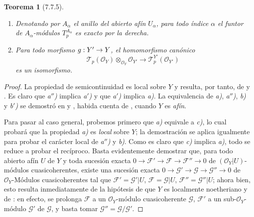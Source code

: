 \documentclass[10pt,oneside,openany]{book}
\theoremstyle{egaenv}\newtheorem*{env}{---}
\theoremstyle{egastatement}
\newtheorem*{theorem}{Teorema}
\theoremstyle{egadescription}
\renewcommand{\to}{\mathchoice{\longrightarrow}{\rightarrow}{\rightarrow}{\rightarrow}}
\begin{document}
\begin{theorem}[7.7.5]
\begin{enumerate}
  \item[\textup{c)}] Denotando por $A_\alpha$ el anillo del abierto afín $U_\alpha$,
    para todo índice $\alpha$ el funtor de $A_\alpha$-módulos
    $T_p^{A_\alpha}$ es exacto por la derecha.

  \item[\textup{d)}] Para todo morfismo $g:Y'\to Y$, el homomorfismo canónico
    \[
      \mathscr T_p(\mathscr O_Y)
      \otimes_{\mathscr O_Y}\mathscr O_{Y'}
      \longrightarrow
      \mathscr T_p^{Y'}(\mathscr O_{Y'})
      \tag{7.7.5.3}\label{III.7.7.5.3.fr}
    \]
    es un isomorfismo.
\end{enumerate}
\end{theorem}

\begin{proof}
La propiedad de semicontinuidad es local sobre $Y$ y resulta, por tanto, de
 y . Es claro que \emph{a$''$)} implica \emph{a$'$)} y que
\emph{a$'$)} implica \emph{a)}. La equivalencia de \emph{a)}, \emph{a$''$)}, \emph{b)} y \emph{b$'$)} se demostró en
 y , habida cuenta de
, cuando $Y$ es \emph{afín}.

Para pasar al caso general, probemos primero que \emph{a)} equivale a \emph{c)}, lo cual
probará que la propiedad \emph{a)} es \emph{local} sobre $Y$; la demostración se aplica
igualmente para probar el carácter local de \emph{a$''$)} y \emph{b)}. Como es claro que \emph{c)}
implica \emph{a)}, todo se reduce a probar el recíproco. Basta evidentemente demostrar
que, para todo abierto afín $U$ de $Y$ y toda sucesión exacta
$0\longrightarrow\mathscr F'\longrightarrow\mathscr F\longrightarrow\mathscr F''\longrightarrow0$
de $(\mathscr O_Y|U)$-módulos cuasicoherentes, existe una sucesión exacta
$0\longrightarrow\mathscr G'\longrightarrow\mathscr G\longrightarrow\mathscr G''\longrightarrow0$
de $\mathscr O_Y$-Módulos cuasicoherentes tal que
$\mathscr F'=\mathscr G'|U$, $\mathscr F=\mathscr G|U$, $\mathscr F''=\mathscr G''|U$;
ahora bien, esto resulta inmediatamente de la hipótesis de que $Y$ es
localmente noetheriano y de : en efecto, se prolonga
$\mathscr F$ a un $\mathscr O_Y$-módulo cuasicoherente $\mathscr G$,
$\mathscr F'$ a un sub-$\mathscr O_Y$-módulo $\mathscr G'$ de $\mathscr G$, y
basta tomar $\mathscr G''=\mathscr G/\mathscr G'$.


\end{proof}
\end{document}
